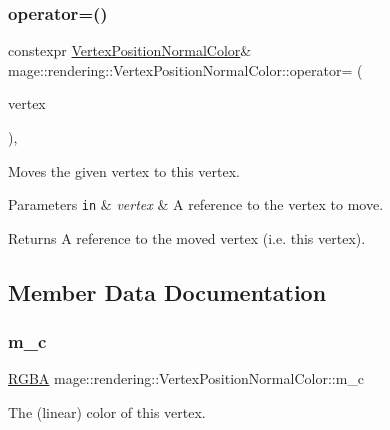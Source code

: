 \subsubsection{\texorpdfstring{operator=()}{operator=()}\hspace{0.1cm}{\footnotesize\ttfamily [2/2]}}
{\footnotesize\ttfamily constexpr \hyperlink{structmage_1_1rendering_1_1_vertex_position_normal_color}{Vertex\+Position\+Normal\+Color}\& mage\+::rendering\+::\+Vertex\+Position\+Normal\+Color\+::operator= (\begin{DoxyParamCaption}\item[{\hyperlink{structmage_1_1rendering_1_1_vertex_position_normal_color}{Vertex\+Position\+Normal\+Color} \&\&}]{vertex }\end{DoxyParamCaption})\hspace{0.3cm}{\ttfamily [default]}, {\ttfamily [noexcept]}}

Moves the given vertex to this vertex.


\begin{DoxyParams}[1]{Parameters}
\mbox{\tt in}  & {\em vertex} & A reference to the vertex to move. \\
\hline
\end{DoxyParams}
\begin{DoxyReturn}{Returns}
A reference to the moved vertex (i.\+e. this vertex). 
\end{DoxyReturn}


\subsection{Member Data Documentation}
\hypertarget{structmage_1_1rendering_1_1_vertex_position_normal_color_a41410eb9dab6e73b59aac40b69637c05}{}\label{structmage_1_1rendering_1_1_vertex_position_normal_color_a41410eb9dab6e73b59aac40b69637c05} 
\subsubsection{\texorpdfstring{m\+\_\+c}{m\_c}}
{\footnotesize\ttfamily \hyperlink{structmage_1_1_r_g_b_a}{R\+G\+BA} mage\+::rendering\+::\+Vertex\+Position\+Normal\+Color\+::m\+\_\+c}

The (linear) color of this vertex. \hypertarget{structmage_1_1rendering_1_1_vertex_position_normal_color_abf35d5cb0057f76dbd6f153ee0f412f4}{}\label{structmage_1_1rendering_1_1_vertex_position_normal_color_abf35d5cb0057f76dbd6f153ee0f412f4} 
